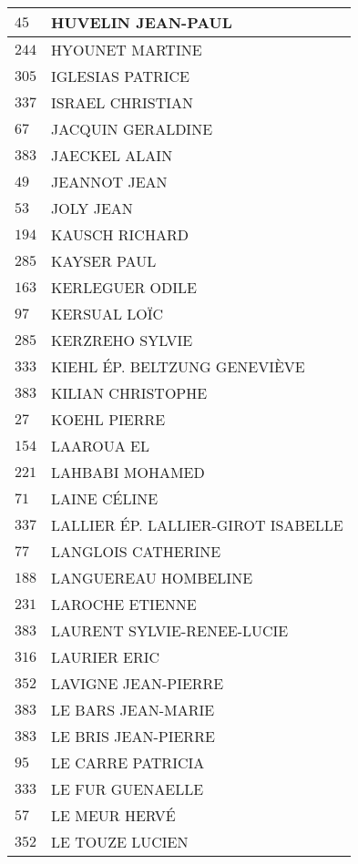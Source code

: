 \begin{xltabular}{\linewidth}{|l|X|}
    \hline
    $45$ & HUVELIN JEAN-PAUL \\
    \hline
    $244$ & HYOUNET MARTINE \\
    \hline
    $305$ & IGLESIAS PATRICE \\
    \hline
    $337$ & ISRAEL CHRISTIAN \\
    \hline
    $67$ & JACQUIN GERALDINE \\
    \hline
    $383$ & JAECKEL ALAIN \\
    \hline
    $49$ & JEANNOT JEAN \\
    \hline
    $53$ & JOLY JEAN \\
    \hline
    $194$ & KAUSCH RICHARD \\
    \hline
    $285$ & KAYSER PAUL \\
    \hline
    $163$ & KERLEGUER ODILE \\
    \hline
    $97$ & KERSUAL LOÏC \\
    \hline
    $285$ & KERZREHO SYLVIE \\
    \hline
    $333$ & KIEHL ÉP. BELTZUNG GENEVIÈVE \\
    \hline
    $383$ & KILIAN CHRISTOPHE \\
    \hline
    $27$ & KOEHL PIERRE \\
    \hline
    $154$ & LAAROUA EL \\
    \hline
    $221$ & LAHBABI MOHAMED \\
    \hline
    $71$ & LAINE CÉLINE \\
    \hline
    $337$ & LALLIER ÉP. LALLIER-GIROT ISABELLE \\
    \hline
    $77$ & LANGLOIS CATHERINE \\
    \hline
    $188$ & LANGUEREAU HOMBELINE \\
    \hline
    $231$ & LAROCHE ETIENNE \\
    \hline
    $383$ & LAURENT SYLVIE-RENEE-LUCIE \\
    \hline
    $316$ & LAURIER ERIC \\
    \hline
    $352$ & LAVIGNE JEAN-PIERRE \\
    \hline
    $383$ & LE BARS JEAN-MARIE \\
    \hline
    $383$ & LE BRIS JEAN-PIERRE \\
    \hline
    $95$ & LE CARRE PATRICIA \\
    \hline
    $333$ & LE FUR GUENAELLE \\
    \hline
    $57$ & LE MEUR HERVÉ \\
    \hline
    $352$ & LE TOUZE LUCIEN \\

\end{xltabular}
